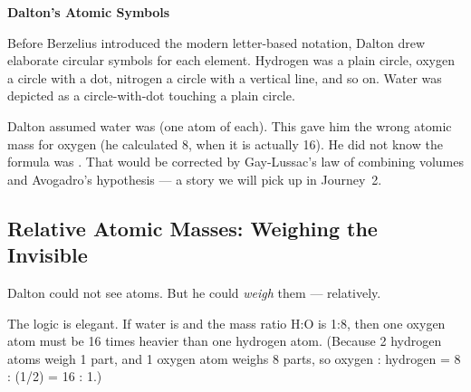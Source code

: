 \documentclass[12pt, a4paper]{book}
\theoremstyle{definition}
\begin{document}
\begin{historybox}
\textbf{Dalton's Atomic Symbols}

Before Berzelius introduced the modern letter-based notation,
Dalton drew elaborate circular symbols for each element.
Hydrogen was a plain circle,
oxygen a circle with a dot,
nitrogen a circle with a vertical line, and so on.
Water was depicted as a circle-with-dot touching a plain circle.

Dalton assumed water was  (one atom of each).
This gave him the wrong atomic mass for oxygen
(he calculated 8, when it is actually 16).
He did not know the formula was .
That would be corrected by Gay-Lussac's law of combining volumes
and Avogadro's hypothesis --- a story we will pick up in Journey~2.
\end{historybox}

\subsection{Relative Atomic Masses: Weighing the Invisible}

Dalton could not see atoms.
But he could \emph{weigh} them --- relatively.

The logic is elegant.
If water is  and the mass ratio H:O is 1:8,
then one oxygen atom must be 16 times heavier than
one hydrogen atom.
(Because 2 hydrogen atoms weigh 1 part, and 1 oxygen atom
weighs 8 parts, so oxygen : hydrogen = 8 : (1/2) = 16 : 1.)

\begin{center}
\end{center}
\end{document}
